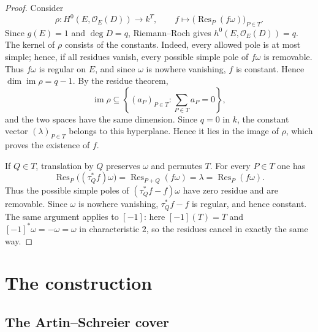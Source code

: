 \documentclass[11pt]{article}
\theoremstyle{remark}
\newcommand{\Res}{\operatorname{Res}}
\begin{document}
\begin{proof}
Consider
\[
 \rho:H^0(E,\mathcal O_E(D))\longrightarrow k^T,\qquad
 f\longmapsto\bigl(\Res_P(f\omega)\bigr)_{P\in T}.
\]
Since $g(E)=1$ and $\deg D=q$, Riemann--Roch gives
$h^0(E,\mathcal O_E(D))=q$.  The kernel of $\rho$ consists of the
constants.  Indeed, every allowed pole is at most simple; hence, if all
residues vanish, every possible simple pole of $f\omega$ is removable.
Thus $f\omega$ is regular on $E$, and since $\omega$ is nowhere
vanishing, $f$ is constant.  Hence
$\dim\operatorname{im}\rho=q-1$.  By the residue theorem,
\[
 \operatorname{im}\rho
 \subseteq\left\{(a_P)_{P\in T}:\sum_{P\in T}a_P=0\right\},
\]
and the two spaces have the same dimension.  Since $q=0$ in $k$, the
constant vector $(\lambda)_{P\in T}$ belongs to this hyperplane.  Hence it
lies in the image of $\rho$, which proves the existence of $f$.

If $Q\in T$, translation by $Q$ preserves $\omega$ and permutes $T$.
For every $P\in T$ one has
\[
 \Res_P\bigl((\tau_Q^*f)\omega\bigr)
 =\Res_{P+Q}(f\omega)=\lambda=\Res_P(f\omega).
\]
Thus the possible simple poles of $(\tau_Q^*f-f)\omega$ have zero
residue and are removable.  Since $\omega$ is nowhere vanishing,
$\tau_Q^*f-f$ is regular, and hence constant.  The same argument applies
to $[-1]$: here $[-1](T)=T$ and $[-1]^*\omega=-\omega=\omega$ in
characteristic $2$, so the residues cancel in exactly the same way.
\end{proof}

\section{The construction}\label{sec:construction}

\subsection{The Artin--Schreier cover}
\end{document}

